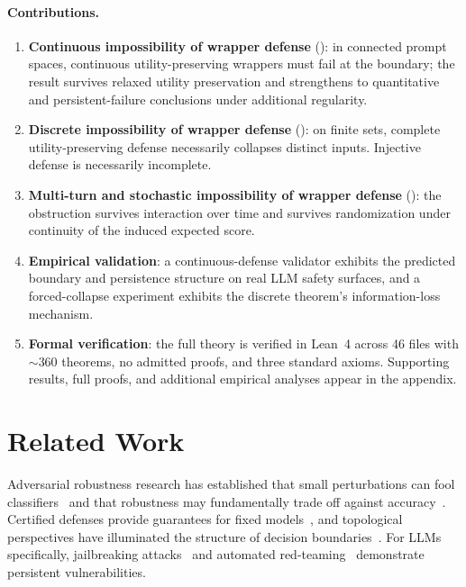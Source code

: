 \documentclass[11pt]{article}
\begin{document}
\paragraph{Contributions.}
\begin{enumerate}[nosep]
  \item \textbf{Continuous impossibility of wrapper defense}
    ():
    in connected prompt spaces, continuous utility-preserving wrappers
    must fail at the boundary; the result survives relaxed utility
    preservation and strengthens to quantitative and persistent-failure
    conclusions under additional regularity.
  \item \textbf{Discrete impossibility of wrapper defense}
    (): on finite sets, complete
    utility-preserving defense necessarily collapses distinct inputs.
    Injective defense is necessarily incomplete.
  \item \textbf{Multi-turn and stochastic impossibility of wrapper defense}
    (): the obstruction survives
    interaction over time and survives randomization under continuity of
    the induced expected score.
  \item \textbf{Empirical validation}: a continuous-defense validator
    exhibits the predicted boundary and persistence structure on real
    LLM safety surfaces, and a forced-collapse experiment exhibits the
    discrete theorem's information-loss mechanism.
  \item \textbf{Formal verification}: the full theory is verified in
    Lean~4 across 46 files with ${\sim}360$ theorems, no admitted
    proofs, and three standard axioms. Supporting results, full proofs,
    and additional empirical analyses appear in the appendix.
\end{enumerate}


\section{Related Work}
\label{sec:related}

Adversarial robustness research has established that small
perturbations can fool classifiers~\cite{szegedy2013intriguing,
goodfellow2014explaining,carlini2017evaluating,madry2018towards} and
that robustness may fundamentally trade off against
accuracy~\cite{tsipras2018robustness,fawzi2018adversarial}. Certified
defenses provide guarantees for fixed
models~\cite{cohen2019certified,katz2017reluplex,singh2019abstract,
huang2017safety,bagnall2019certifying}, and topological perspectives
have illuminated the structure of decision
boundaries~\cite{naitzat2020topology}. For LLMs specifically,
jailbreaking attacks~\cite{zou2023universal,chao2024jailbreaking,
mehrotra2024tree,greshake2023indirect} and automated
red-teaming~\cite{mouret2015illuminating,samvelyan2024rainbow}
demonstrate persistent vulnerabilities.
\end{document}
